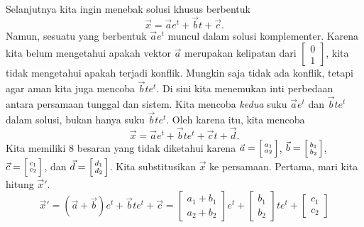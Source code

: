 \begin{example}
Selanjutnya kita ingin menebak solusi khusus berbentuk
\begin{equation*}
\vec{x} = 
\vec{a}
e^{t}
+
\vec{b}
t +
\vec{c} .
\end{equation*}
Namun, sesuatu yang berbentuk $\vec{a} e^t$ muncul dalam solusi
komplementer.  Karena kita belum mengetahui apakah vektor $\vec{a}$
merupakan kelipatan dari $\left[ \begin{smallmatrix}
0 \\
1
\end{smallmatrix} \right]$, kita tidak mengetahui apakah terjadi
konflik.  Mungkin saja tidak ada konflik,
tetapi agar aman kita juga mencoba
$\vec{b} t e^t$.
Di sini kita menemukan
inti perbedaan antara persamaan tunggal dan sistem.  Kita mencoba
\emph{kedua} suku $\vec{a} e^t$ dan $\vec{b} t e^t$ dalam solusi,
bukan hanya suku $\vec{b} t e^t$.
Oleh karena itu, kita mencoba
\begin{equation*}
\vec{x} = 
\vec{a}
e^{t}
+
\vec{b}
t
e^{t}
+
\vec{c}
t +
\vec{d}.
\end{equation*}
Kita memiliki 8 besaran yang tidak diketahui karena
$\vec{a} =
\Bigl[ \begin{smallmatrix} a_1 \\ a_2 \end{smallmatrix} \Bigr]$,
$\vec{b} =
\Bigl[ \begin{smallmatrix} b_1 \\ b_2 \end{smallmatrix} \Bigr]$,
$\vec{c} =
\Bigl[ \begin{smallmatrix} c_1 \\ c_2 \end{smallmatrix} \Bigr]$,
dan
$\vec{d} =
\Bigl[ \begin{smallmatrix} d_1 \\ d_2 \end{smallmatrix} \Bigr]$.
Kita substitusikan $\vec{x}$ ke persamaan.  Pertama,
mari kita hitung ${\vec{x}}'$.
\begin{equation*}
{\vec{x}}' = 
\left( \vec{a} + \vec{b} \right)
e^{t}
+
\vec{b}
t
e^{t}
+
\vec{c} =
\begin{bmatrix}
a_1 + b_1 \\ a_2+b_2
\end{bmatrix}
e^{t}
+
\begin{bmatrix}
b_1 \\ b_2
\end{bmatrix}
t e^{t}
+
\begin{bmatrix}
c_1 \\ c_2

\end{bmatrix}
\end{equation*}
\end{example}
